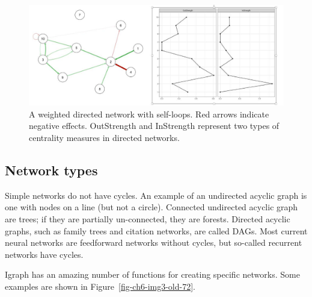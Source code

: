 \documentclass[
  letterpaper,
]{scrbook}
\begin{document}
\begin{figure}

{\centering \includegraphics[width=5.99934in,height=\textheight]{media/ch6/image2.jpg}

}

\caption{\label{fig-ch6-img2-old-71}A weighted directed network with
self-loops. Red arrows indicate negative effects. OutStrength and
InStrength represent two types of centrality measures in directed
networks.}

\end{figure}

\hypertarget{network-types}{%
\subsection{Network types}\label{network-types}}

Simple networks do not have cycles. An example of an undirected acyclic
graph is one with nodes on a line (but not a circle). Connected
undirected acyclic graph are trees; if they are partially un-connected,
they are forests. Directed acyclic graphs, such as family trees and
citation networks, are called DAGs. Most current neural networks are
feedforward networks without cycles, but so-called recurrent networks
have cycles.

Igraph has an amazing number of functions for creating specific
networks. Some examples are shown in Figure~\ref{fig-ch6-img3-old-72}.
\end{document}
